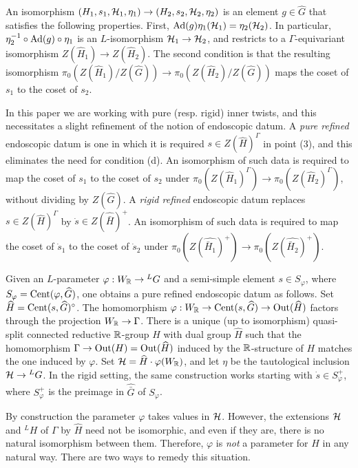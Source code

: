 \documentclass{article}
\theoremstyle{definition}
\numberwithin{equation}{section}
\renewcommand{\-}{\hyp{}}
\begin{document}
An isomorphism $(H_1,s_1,\mathcal{H}_1,\eta_1) \to (H_2,s_2,\mathcal{H}_2,\eta_2)$ is an element $g \in \hat G$ that satisfies the following properties. First, $\textrm{Ad}(g)\eta_1(\mathcal{H}_1)=\eta_2(\mathcal{H}_2)$. In particular, $\eta_2^{-1}\circ\textrm{Ad}(g)\circ\eta_1$ is an $L$\-isomorphism $\mathcal{H}_1 \to \mathcal{H}_2$, and restricts to a $\Gamma$-equivariant isomorphism $Z(\hat H_1) \to Z(\hat H_2)$. The second condition is that the resulting isomorphism $\pi_0(Z(\hat H_1)/Z(\hat G)) \to \pi_0(Z(\hat H_2)/Z(\hat G))$ maps the coset of $s_1$ to the coset of $s_2$.

In this paper we are working with pure (resp. rigid) inner twists, and this necessitates a slight refinement of the notion of endoscopic datum. A \emph{pure refined} endoscopic datum is one in which it is required $s \in Z(\hat H)^\Gamma$ in point (3), and this eliminates the need for condition (d). An isomorphism of such data is required to map the coset of $s_1$ to the coset of $s_2$ under $\pi_0(Z(\hat H_1)^\Gamma) \to \pi_0(Z(\hat H_2)^\Gamma)$, without dividing by $Z(\hat G)$. A \emph{rigid refined} endoscopic datum replaces $s \in Z(\hat H)^\Gamma$ by $\dot s \in Z(\hat{\bar H})^+$. An isomorphism of such data is required to map the coset of $\dot s_1$ to the coset of $\dot s_2$ under $\pi_0(Z(\hat{\bar H_1})^+) \to \pi_0(Z(\hat{ \bar H_2})^+)$.

Given an $L$\-parameter $\varphi : W_{\mathbb{R}} \to {^LG}$ and a semi-simple element $s \in S_\varphi$, where $S_\varphi=\textrm{Cent}(\varphi,\widehat G)$, one obtains a pure refined endoscopic datum as follows. Set $\widehat H = \textrm{Cent}(s,\widehat G)^\circ$. The homomorphism  $\varphi : W_{\mathbb{R}} \to \textrm{Cent}(s,\widehat G) \to \textrm{Out}(\widehat H)$ factors through the projection $W_{\mathbb{R}} \to \Gamma$. There is a unique (up to isomorphism) quasi-split connected reductive $\mathbb{R}$-group $H$ with dual group $\hat H$ such that the homomorphism $\Gamma \to \textrm{Out}(H)=\textrm{Out}(\widehat H)$ induced by the $\mathbb{R}$-structure of $H$ matches the one induced by $\varphi$. Set $\mathcal{H}=\widehat H \cdot \varphi(W_{\mathbb{R}})$, and let $\eta$ be the tautological inclusion $\mathcal{H} \to {^LG}$. In the rigid setting, the same construction works starting with $\dot s \in S_\varphi^+$, where $S_\varphi^+$ is the preimage in $\hat{\bar G}$ of $S_\varphi$.

By construction the parameter $\varphi$ takes values in $\mathcal{H}$. However, the extensions $\mathcal{H}$ and $^LH$ of $\Gamma$ by $\hat H$ need not be isomorphic, and even if they are, there is no natural isomorphism between them. Therefore, $\varphi$ is \emph{not} a parameter for $H$ in any natural way. There are two ways to remedy this situation.
\end{document}
